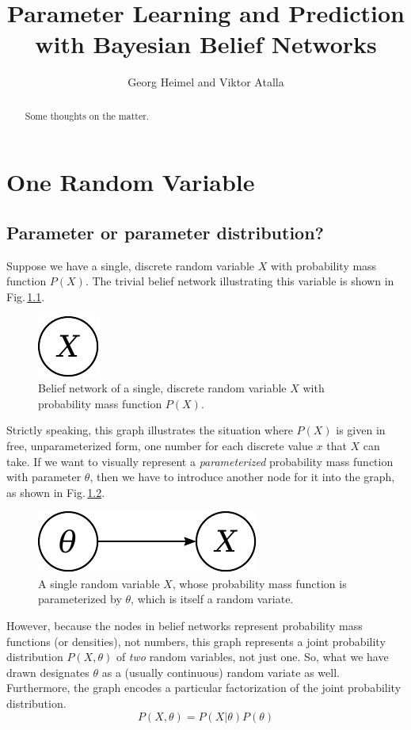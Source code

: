 \documentclass[]{report}
\title{Parameter Learning and Prediction with Bayesian Belief Networks}
\author{Georg Heimel and Viktor Atalla}
\begin{document}
\maketitle


\begin{abstract}
Some thoughts on the matter.
\end{abstract}


\chapter{One Random Variable} \label{chap:1var}
\section{Parameter or parameter distribution?} \label{sect:set_param}
Suppose we have a single, discrete random variable $X$ with probability mass function $P(X)$. The trivial belief network illustrating this variable is shown in Fig.\,\ref{fig:1var}.
\begin{figure}[h]
	\centering
	\includegraphics[scale=0.5]{1var}
	\caption{Belief network of a single, discrete random variable $X$ with probability mass function $P(X)$.}
	\label{fig:1var}
\end{figure}
Strictly speaking, this graph illustrates the situation where $P(X)$ is given in free, unparameterized form, one number for each discrete value $x$ that $X$ can take. If we want to visually represent a \emph{parameterized} probability mass function with parameter $\theta$, then we have to introduce another node for it into the graph, as shown in Fig.\,\ref{fig:1var1param}.
\begin{figure}[h]
	\centering
	\includegraphics[scale=0.5]{1var_1param}
	\caption{A single random variable $X$, whose probability mass function is parameterized by $\theta$, which is itself a random variate.}
	\label{fig:1var1param}
\end{figure}
However, because the nodes in belief networks represent probability mass functions (or densities), not numbers, this graph represents a joint probability distribution $P(X, \theta ) $ of \emph{two} random variables, not just one. So, what we have drawn designates $\theta$ as a (usually continuous) random variate as well. Furthermore, the graph encodes a particular factorization of the joint probability distribution.
\begin{equation}
P( X, \theta)
=
P( X | \theta )
P( \theta )
\end{equation}
\end{document}
